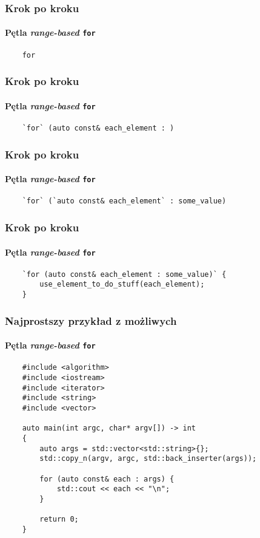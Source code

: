 \documentclass[aspectratio=169]{beamer}
\begin{document}
\begin{frame}[fragile]
    \frametitle{Krok po kroku}
    \framesubtitle{Pętla \emph{range-based} {\tt for}}

    \begin{lstlisting}
    for
    \end{lstlisting}
    \vspace{2.4em}
\end{frame}

\begin{frame}[fragile]
    \frametitle{Krok po kroku}
    \framesubtitle{Pętla \emph{range-based} {\tt for}}

    \begin{lstlisting}
    `for` (auto const& each_element : )
    \end{lstlisting}
    \vspace{2.4em}
\end{frame}

\begin{frame}[fragile]
    \frametitle{Krok po kroku}
    \framesubtitle{Pętla \emph{range-based} {\tt for}}

    \begin{lstlisting}
    `for` (`auto const& each_element` : some_value)
    \end{lstlisting}
    \vspace{2.4em}
\end{frame}

\begin{frame}[fragile]
    \frametitle{Krok po kroku}
    \framesubtitle{Pętla \emph{range-based} {\tt for}}

    \begin{lstlisting}
    `for (auto const& each_element : some_value)` {
        use_element_to_do_stuff(each_element);
    }
    \end{lstlisting}
\end{frame}

\begin{frame}[fragile]
    \frametitle{Najprostszy przykład z możliwych}
    \framesubtitle{Pętla \emph{range-based} {\tt for}}

    {\footnotesize
    \begin{lstlisting}
    #include <algorithm>
    #include <iostream>
    #include <iterator>
    #include <string>
    #include <vector>

    auto main(int argc, char* argv[]) -> int
    {
        auto args = std::vector<std::string>{};
        std::copy_n(argv, argc, std::back_inserter(args));

        for (auto const& each : args) {
            std::cout << each << "\n";
        }

        return 0;
    }
    \end{lstlisting}}
\end{frame}
\end{document}
